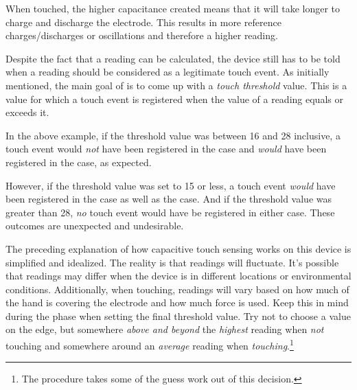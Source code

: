 When touched, the higher capacitance created means that it will take longer to
charge and discharge the electrode.  This results in more reference
charges/discharges or oscillations and therefore a higher reading.

\par\medskip

Despite the fact that a reading can be calculated, the device still has to be
told when a reading should be considered as a legitimate touch event.  As
initially mentioned, the main goal of  is to come up with a \textit{touch
threshold} value.  This is a value for which a touch event is registered
when the value of a reading equals or exceeds it.

\par\medskip

In the above example, if the threshold value was between \num{16} and \num{28}
inclusive, a touch event would \textit{not} have been registered in the
 case and \textit{would} have been registered in the
 case, as expected.

\par\medskip

However, if the threshold value was set to \num{15} or less, a touch event
\textit{would} have been registered in the  case as well
as the  case.  And if the threshold value was greater than
\num{28}, \textit{no} touch event would have be registered in either case.
These outcomes are unexpected and undesirable.

\par\medskip

The preceding explanation of how capacitive touch sensing works on this device is
simplified and idealized.  The reality is that readings will fluctuate.  It's
possible that readings may differ when the device is in different locations or
environmental conditions.  Additionally, when touching, readings will vary based
on how much of the hand is covering the electrode and how much force is used.
Keep this in mind during the  phase when setting the final threshold
value.  Try not to choose a value on the edge, but somewhere
\textit{above and beyond} the \textit{highest} reading when \textit{not}
touching and somewhere around an \textit{average} reading when
\textit{touching}.\footnote{ The  procedure takes some of the guess
work out of this decision.}

